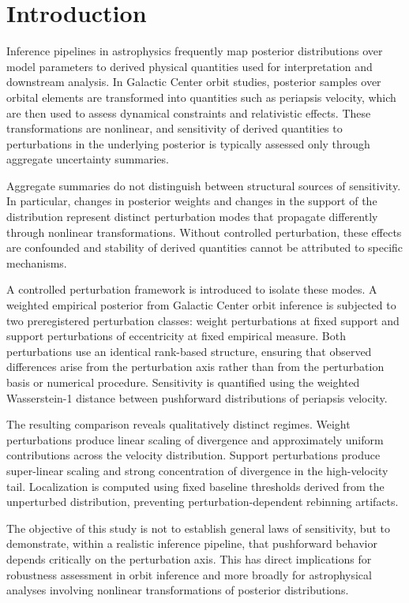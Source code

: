 \documentclass[a4paper,fleqn,usenatbib]{mnras}
\begin{document}
\section{Introduction}
\label{sec:intro}

Inference pipelines in astrophysics frequently map posterior distributions
over model parameters to derived physical quantities used for interpretation
and downstream analysis. In Galactic Center orbit studies, posterior samples
over orbital elements are transformed into quantities such as periapsis
velocity, which are then used to assess dynamical constraints and relativistic
effects. These transformations are nonlinear, and sensitivity of derived
quantities to perturbations in the underlying posterior is typically assessed
only through aggregate uncertainty summaries.

Aggregate summaries do not distinguish between structural sources of
sensitivity. In particular, changes in posterior weights and changes in the
support of the distribution represent distinct perturbation modes that
propagate differently through nonlinear transformations. Without controlled
perturbation, these effects are confounded and stability of derived quantities
cannot be attributed to specific mechanisms.

A controlled perturbation framework is introduced to isolate these modes. A
weighted empirical posterior from Galactic Center orbit inference is subjected
to two preregistered perturbation classes: weight perturbations at fixed
support and support perturbations of eccentricity at fixed empirical measure.
Both perturbations use an identical rank-based structure, ensuring that
observed differences arise from the perturbation axis rather than from the
perturbation basis or numerical procedure. Sensitivity is quantified using the
weighted Wasserstein-1 distance between pushforward distributions of periapsis
velocity.

The resulting comparison reveals qualitatively distinct regimes. Weight
perturbations produce linear scaling of divergence and approximately uniform
contributions across the velocity distribution. Support perturbations produce
super-linear scaling and strong concentration of divergence in the
high-velocity tail. Localization is computed using fixed baseline thresholds
derived from the unperturbed distribution, preventing perturbation-dependent
rebinning artifacts.

The objective of this study is not to establish general laws of sensitivity,
but to demonstrate, within a realistic inference pipeline, that pushforward
behavior depends critically on the perturbation axis. This has direct
implications for robustness assessment in orbit inference and more broadly for
astrophysical analyses involving nonlinear transformations of posterior
distributions.
\end{document}
